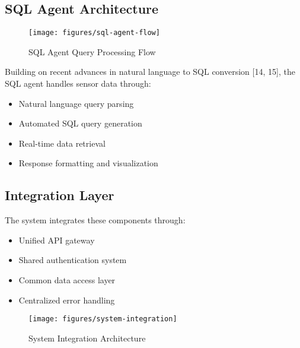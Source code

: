 \subsection{SQL Agent Architecture}
\begin{figure}[!t]
\centering
\texttt{[image: figures/sql-agent-flow]}
\caption{SQL Agent Query Processing Flow}
\label{fig:sql-agent-flow}
\end{figure}

Building on recent advances in natural language to SQL conversion [14, 15], the SQL agent handles sensor data through:
\begin{itemize}
\item Natural language query parsing
\item Automated SQL query generation
\item Real-time data retrieval
\item Response formatting and visualization
\end{itemize}

\subsection{Integration Layer}
The system integrates these components through:
\begin{itemize}
\item Unified API gateway
\item Shared authentication system
\item Common data access layer
\item Centralized error handling
\end{itemize}

\begin{figure}[!t]
\centering
\texttt{[image: figures/system-integration]}
\caption{System Integration Architecture}
\label{fig:system-integration}
\end{figure} 